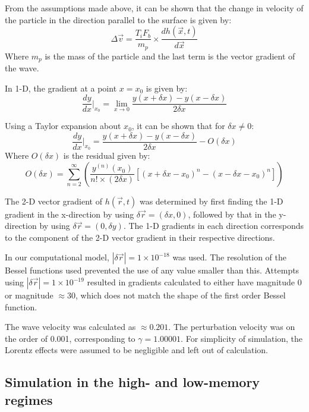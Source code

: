From the assumptions made above, it can be shown that the change in velocity of the particle in the direction parallel to the surface is given by:
\begin{equation} \Delta \vec{v} = \frac{T_i  F_b}{m_p} \times \frac{dh(\vec{x} , t)}{d\vec{x}}\end{equation}
Where $m_p$ is the mass of the particle and the last term is the vector gradient of the wave.

In 1-D, the gradient at a point $x = x_0$ is given by:
\begin{equation} \frac{dy}{dx}\Bigr|_{x_0} = \lim_{x\to0} \frac{y(x+\delta x)-y(x-\delta x)}{2\delta x}\end{equation}

Using a Taylor expansion about $x_0$, it can be shown that for $\delta x\neq 0$:
\begin{equation} \frac{dy}{dx}\Bigr|_{x_0} = \frac{y(x+\delta x) - y(x-\delta x)}{2\delta x} - O(\delta x)\end{equation}
Where $O(\delta x)$ is the residual given by:
\begin{equation}O(\delta x) = \sum_{n=2}^{\infty} \left( \frac{y^{(n)}(x_0)}{n!\times (2\delta x)} \left[ \left( x+\delta x -x_0 \right)^n - \left(x-\delta x -x_0 \right)^n \right] \right)\end{equation}

The 2-D vector gradient of $h(\vec{r} , t)$ was determined by first finding the 1-D gradient in the x-direction by using $\delta \vec{r} = (\delta x,0)$, followed by that in the y-direction by using $\delta \vec{r} = (0,\delta y)$. The 1-D gradients in each direction corresponds to the component of the 2-D vector gradient in their respective directions. 

In our computational model, $|\delta \vec{r}| = 1\times 10^{-18}$ was used. The resolution of the Bessel functions used prevented the use of any value smaller than this. Attempts using $|\delta \vec{r}| = 1\times 10^{-19}$ resulted in gradients calculated to either have magnitude 0 or magnitude $\approx 30$, which does not match the shape of the first order Bessel function.

The wave velocity was calculated as $\approx 0.201$. The perturbation velocity was on the order of 0.001, corresponding to $\gamma = 1.00001$. For simplicity of simulation, the Lorentz effects were assumed to be negligible and left out of calculation.


\subsection{Simulation in the high- and low-memory regimes}

